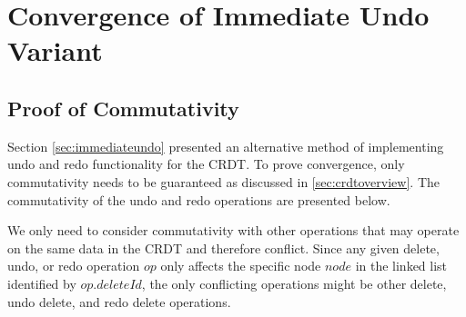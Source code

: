 \documentclass[12pt,a4paper,twoside,openright]{report}
\begin{document}
\chapter{Convergence of Immediate Undo Variant}

\section{Proof of Commutativity} \label{appendix:immundoproof}

Section \cref{sec:immediateundo} presented an alternative method of implementing undo and redo functionality for the CRDT. To prove convergence, only commutativity needs to be guaranteed as discussed in \cref{sec:crdtoverview}. The commutativity of the undo and redo operations are presented below.

We only need to consider commutativity with other operations that may operate on the same data in the CRDT and therefore conflict. Since any given delete, undo, or redo operation $op$ only affects the specific node $node$ in the linked list identified by $op.deleteId$, the only conflicting operations might be other delete, undo delete, and redo delete operations.
						
\end{document}
